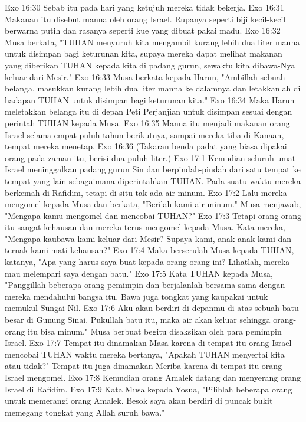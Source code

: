 Exo 16:30  Sebab itu pada hari yang ketujuh mereka tidak bekerja.
Exo 16:31  Makanan itu disebut manna oleh orang Israel. Rupanya seperti biji kecil-kecil berwarna putih dan rasanya seperti kue yang dibuat pakai madu.
Exo 16:32  Musa berkata, "TUHAN menyuruh kita mengambil kurang lebih dua liter manna untuk disimpan bagi keturunan kita, supaya mereka dapat melihat makanan yang diberikan TUHAN kepada kita di padang gurun, sewaktu kita dibawa-Nya keluar dari Mesir."
Exo 16:33  Musa berkata kepada Harun, "Ambillah sebuah belanga, masukkan kurang lebih dua liter manna ke dalamnya dan letakkanlah di hadapan TUHAN untuk disimpan bagi keturunan kita."
Exo 16:34  Maka Harun meletakkan belanga itu di depan Peti Perjanjian untuk disimpan sesuai dengan perintah TUHAN kepada Musa.
Exo 16:35  Manna itu menjadi makanan orang Israel selama empat puluh tahun berikutnya, sampai mereka tiba di Kanaan, tempat mereka menetap.
Exo 16:36  (Takaran benda padat yang biasa dipakai orang pada zaman itu, berisi dua puluh liter.)
Exo 17:1  Kemudian seluruh umat Israel meninggalkan padang gurun Sin dan berpindah-pindah dari satu tempat ke tempat yang lain sebagaimana diperintahkan TUHAN. Pada suatu waktu mereka berkemah di Rafidim, tetapi di situ tak ada air minum.
Exo 17:2  Lalu mereka mengomel kepada Musa dan berkata, "Berilah kami air minum." Musa menjawab, "Mengapa kamu mengomel dan mencobai TUHAN?"
Exo 17:3  Tetapi orang-orang itu sangat kehausan dan mereka terus mengomel kepada Musa. Kata mereka, "Mengapa kaubawa kami keluar dari Mesir? Supaya kami, anak-anak kami dan ternak kami mati kehausan?"
Exo 17:4  Maka berserulah Musa kepada TUHAN, katanya, "Apa yang harus saya buat kepada orang-orang ini? Lihatlah, mereka mau melempari saya dengan batu."
Exo 17:5  Kata TUHAN kepada Musa, "Panggillah beberapa orang pemimpin dan berjalanlah bersama-sama dengan mereka mendahului bangsa itu. Bawa juga tongkat yang kaupakai untuk memukul Sungai Nil.
Exo 17:6  Aku akan berdiri di depanmu di atas sebuah batu besar di Gunung Sinai. Pukullah batu itu, maka air akan keluar sehingga orang-orang itu bisa minum." Musa berbuat begitu disaksikan oleh para pemimpin Israel.
Exo 17:7  Tempat itu dinamakan Masa karena di tempat itu orang Israel mencobai TUHAN waktu mereka bertanya, "Apakah TUHAN menyertai kita atau tidak?" Tempat itu juga dinamakan Meriba karena di tempat itu orang Israel mengomel.
Exo 17:8  Kemudian orang Amalek datang dan menyerang orang Israel di Rafidim.
Exo 17:9  Kata Musa kepada Yosua, "Pilihlah beberapa orang untuk memerangi orang Amalek. Besok saya akan berdiri di puncak bukit memegang tongkat yang Allah suruh bawa."
